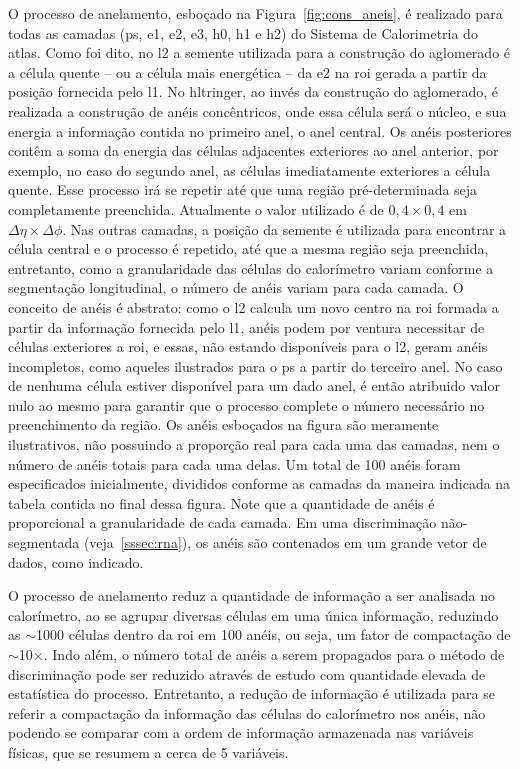 O processo de anelamento, esboçado na Figura~\ref{fig:cons_aneis}, é realizado
para todas as camadas (\gls{ps}, \gls{e1}, \gls{e2}, \gls{e3}, \gls{h0},
\gls{h1} e \gls{h2}) do Sistema de Calorimetria do \gls{atlas}. Como foi dito,
no \gls{l2} a semente utilizada para a construção do aglomerado é a célula quente  -- ou a célula mais
energética -- da \gls{e2} na \gls{roi} gerada a partir da posição 
fornecida pelo \gls{l1}. No \gls{hltringer}, ao invés da construção do
aglomerado, é realizada a construção de anéis concêntricos, onde essa célula
será o núcleo, e sua energia a informação contida no primeiro anel, o anel central. 
Os anéis posteriores contêm a soma da energia das células adjacentes
exteriores ao anel anterior, por exemplo, no caso do segundo anel, as células imediatamente
exteriores a célula quente. Esse processo irá se repetir até que uma região pré-determinada seja
completamente preenchida. Atualmente o valor utilizado é de $0,4\times0,4$ em
$\Delta\eta\times\Delta\phi$. Nas outras camadas, a posição da
semente é utilizada para encontrar a célula central e o processo é repetido, até
que a mesma região seja preenchida, entretanto, como a granularidade das células
do calorímetro variam conforme a segmentação longitudinal, o número de anéis variam
para cada camada. O conceito de anéis é abstrato: como o \gls{l2} calcula
um novo centro na \gls{roi} formada a partir da informação fornecida pelo
\gls{l1}, anéis podem por ventura necessitar de células exteriores a \gls{roi},
e essas, não estando disponíveis para o \gls{l2}, geram anéis incompletos,
como aqueles ilustrados para o \gls{ps} a partir do terceiro anel. 
No caso de nenhuma célula estiver disponível para um dado anel, é então atribuido valor
nulo ao mesmo para garantir que o processo complete o número necessário no
preenchimento da região. Os anéis esboçados na figura são meramente
ilustrativos, não possuindo a proporção real para cada uma das camadas, nem o
número de anéis totais para cada uma delas. Um total de 100 anéis foram 
especificados inicialmente, divididos conforme as camadas da maneira indicada na
tabela contida no final dessa figura. Note que a quantidade de anéis é proporcional 
a granularidade de cada camada. Em uma discriminação não-segmentada
(veja~\ref{sssec:rna}), os anéis são contenados em um grande vetor de dados,
como indicado.

O processo de anelamento reduz a quantidade de informação a ser analisada no
calorímetro, ao se agrupar diversas células em uma única informação, reduzindo
as $\sim$1000 células dentro da \gls{roi} em 100 anéis, ou seja, um fator de
compactação de $\sim$10$\times$. Indo além, o número total de anéis a serem
propagados para o método de discriminação pode ser reduzido através de estudo
com quantidade elevada de estatística do processo. Entretanto, a redução de informação 
é utilizada para se referir a compactação da
informação das células do calorímetro nos anéis, não podendo se comparar 
com a ordem de informação armazenada nas variáveis físicas, 
que se resumem a cerca de 5 variáveis.

